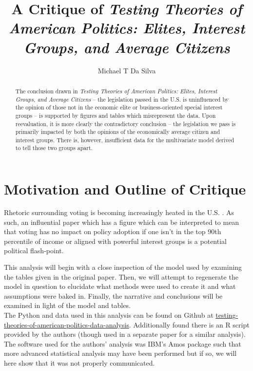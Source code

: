 \documentclass[]{article}
\title{A Critique of \textit{Testing Theories of American Politics: Elites, Interest Groups, and Average Citizens} \cite{gilens}}
\author{Michael T Da Silva}
\begin{document}
\maketitle

\begin{abstract}
	The conclusion drawn in \textit{Testing Theories of American Politics: Elites, Interest Groups, and Average Citizens} -- the legislation passed in the U.S. is uninfluenced by the opinion of those not in the economic elite or business-oriented special interest groups -- is supported by figures and tables which misrepresent the data. Upon reevaluation, it is more clearly the contradictory conclusion -- the legislation we pass is primarily impacted by both the opinions of the economically average citizen and interest groups. There is, however, insufficient data for the multivariate model derived to tell those two groups apart.

\end{abstract}

\section{Motivation and Outline of Critique}
Rhetoric surrounding voting is becoming increasingly heated in the U.S. \cite{voting_rights}. 
As such, an influential paper which has a figure which can be interpreted to mean that voting has no impact on policy adoption if one isn't in the top 90th percentile of income or aligned with powerful interest groups is a potential political flash-point.

This analysis will begin with a close inspection of the model used by examining the tables given in the original paper.
Then, we will attempt to regenerate the model in question to elucidate what methods were used to create it and what assumptions were baked in.
Finally, the narrative and conclusions will be examined in light of the model and tables.\\

The Python and data used in this analysis can be found on Github at \href{https://github.com/ChemistryMickey/testing-theories-of-american-politics-data-analysis}{testing-theories-of-american-politics-data-analysis}. Additionally found there is an R script provided by the authors (though used in a separate paper for a similar analysis). The software used for the authors' analysis was IBM's Amos package such that more advanced statistical analysis may have been performed but if so, we will here show that it was not properly communicated.
\end{document}
